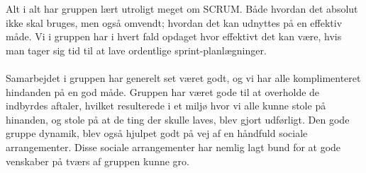 Alt i alt har gruppen lært utroligt meget om SCRUM. Både hvordan det absolut ikke skal bruges, men også omvendt; hvordan det kan udnyttes på en effektiv måde. Vi i gruppen har i hvert fald opdaget hvor effektivt det kan være, hvis man tager sig tid til at lave ordentlige sprint-planlægninger.
\\\\ %
Samarbejdet i gruppen har generelt set været godt, og vi har alle komplimenteret hindanden på en god måde. Gruppen har været gode til at overholde de indbyrdes aftaler, hvilket resulterede i et miljø hvor vi alle kunne stole på hinanden, og stole på at de ting der skulle laves, blev gjort udførligt. Den gode gruppe dynamik, blev også hjulpet godt på vej af en håndfuld sociale arrangementer. Disse sociale arrangementer har nemlig lagt bund for at gode venskaber på tværs af gruppen kunne gro. 

